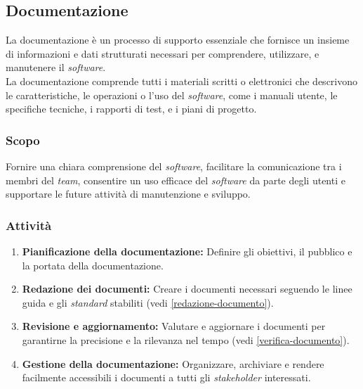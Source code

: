 \subsection{Documentazione}

La documentazione è un processo di supporto essenziale che fornisce un insieme
di informazioni e dati strutturati necessari per comprendere, utilizzare, e
manutenere il \textit{software}.\\
La documentazione comprende tutti i materiali scritti o elettronici che
descrivono le caratteristiche, le operazioni o l'uso del \textit{software},
come i manuali utente, le specifiche tecniche, i rapporti di test, e i piani di
progetto.

\subsubsection{Scopo}
Fornire una chiara comprensione del \textit{software}, facilitare la
comunicazione tra i membri del \textit{team}, consentire un uso efficace del
\textit{software} da parte degli utenti e supportare le future attività di
manutenzione e sviluppo.

\subsubsection{Attività}
\begin{enumerate}
	\item \textbf{Pianificazione della documentazione:} Definire gli obiettivi,
	      il pubblico e la portata della documentazione.
	\item \textbf{Redazione dei documenti:} Creare i documenti necessari
	      seguendo le linee guida e gli \textit{standard} stabiliti
	      (vedi \cref{redazione-documento}).
	\item \textbf{Revisione e aggiornamento:} Valutare e aggiornare i documenti
	      per garantirne la precisione e la rilevanza nel tempo (vedi
	      \cref{verifica-documento}).
	\item \textbf{Gestione della documentazione:} Organizzare, archiviare e
	      rendere facilmente accessibili i documenti a tutti gli
	      \textit{stakeholder} interessati.
\end{enumerate}

